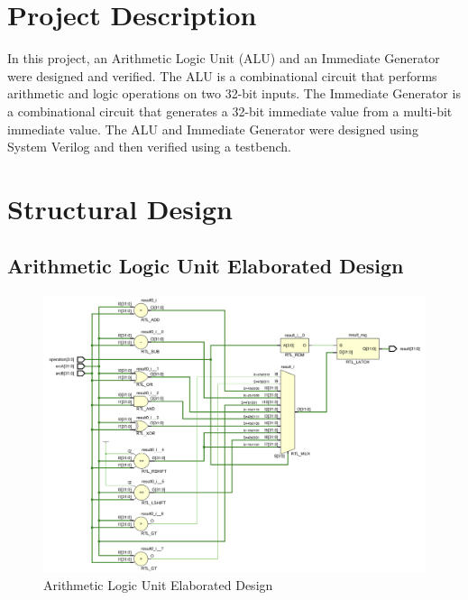 \documentclass[
    a4paper, %
	12pt, %
    ]{CSSullivanBusinessReport}
\begin{document}
\begin{fullwidth} %

\section{Project Description} %

In this project, an Arithmetic Logic Unit (ALU) and an Immediate Generator were designed and verified. The ALU is a combinational circuit that performs arithmetic and logic operations on two 32-bit inputs. The Immediate Generator is a combinational circuit that generates a 32-bit immediate value from a multi-bit immediate value. The ALU and Immediate Generator were designed using System Verilog and then verified using a testbench.

\section{Structural Design} %

\subsection{Arithmetic Logic Unit Elaborated Design} %

\begin{figure}[H]
    \centering
    \captionsetup{style=widetable}
    \includegraphics[width=.80\pdfpagewidth]{Figures/ALU-Elaborated-Design.png}
    \caption{Arithmetic Logic Unit Elaborated Design}
    \label{fig:ALUElaboratedDesign}
\end{figure}


\end{fullwidth}
\end{document}
